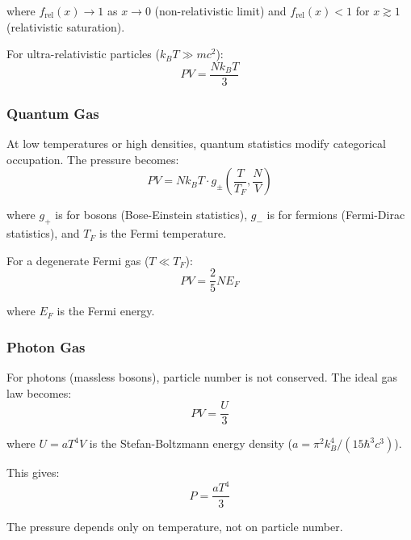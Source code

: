 where $f_{\text{rel}}(x) \to 1$ as $x \to 0$ (non-relativistic limit) and $f_{\text{rel}}(x) < 1$ for $x \gtrsim 1$ (relativistic saturation).

For ultra-relativistic particles ($k_B T \gg mc^2$):
\begin{equation}
PV = \frac{Nk_B T}{3}
\end{equation}

\subsubsection{Quantum Gas}

At low temperatures or high densities, quantum statistics modify categorical occupation. The pressure becomes:
\begin{equation}
PV = Nk_B T \cdot g_{\pm}\left(\frac{T}{T_F}, \frac{N}{V}\right)
\end{equation}

where $g_+$ is for bosons (Bose-Einstein statistics), $g_-$ is for fermions (Fermi-Dirac statistics), and $T_F$ is the Fermi temperature.

For a degenerate Fermi gas ($T \ll T_F$):
\begin{equation}
PV = \frac{2}{5}NE_F
\end{equation}

where $E_F$ is the Fermi energy.

\subsubsection{Photon Gas}

For photons (massless bosons), particle number is not conserved. The ideal gas law becomes:
\begin{equation}
PV = \frac{U}{3}
\end{equation}

where $U = aT^4 V$ is the Stefan-Boltzmann energy density ($a = \pi^2 k_B^4/(15\hbar^3 c^3)$).

This gives:
\begin{equation}
P = \frac{aT^4}{3}
\end{equation}

The pressure depends only on temperature, not on particle number.

